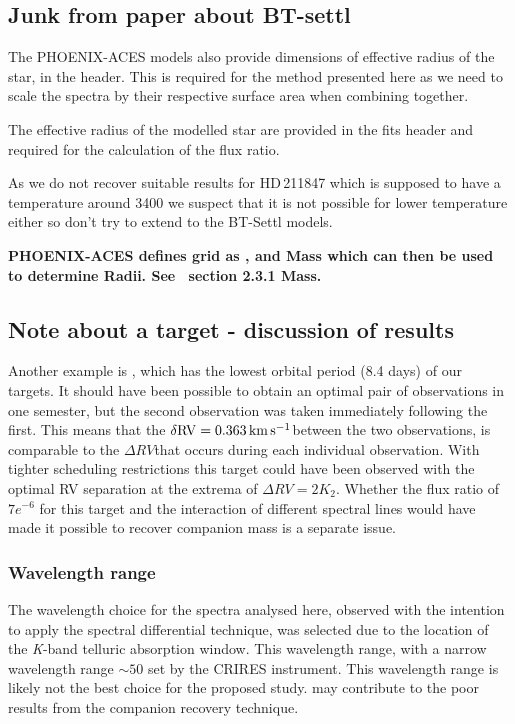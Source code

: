 \subsection{Junk from paper about BT-settl}

The {PHOENIX-ACES} models also provide dimensions of effective radius of the star, in the header.
This is required for the method presented here as we need to scale the spectra by their respective surface area when combining together.


The effective radius of the modelled star are provided in the fits header and required for the calculation of the flux ratio.


As we do not recover suitable results for HD\,211847 which is supposed to have a temperature around 3400\K{} we suspect that it is not possible for lower temperature either so don't try to extend to the {BT-Settl} models.


\textbf{
    {PHOENIX-ACES} defines grid as \Teff{}, \logg{} and Mass which can then be used to determine Radii.
    See~\citep{husser_new_2013} section 2.3.1 Mass.}




\subsection{Note about a target - discussion of results}
Another example is , which has the lowest orbital period (8.4 days) of our targets.
It should have been possible to obtain an optimal pair of observations in one semester, but the second observation was taken immediately following the first.
This means that the \(\rm \delta {RV} = 0.363\,\si{\kilo\metre\per\second}{}\)between the two observations, is comparable to the \(\Delta {RV}\)that occurs during each individual observation.
With tighter scheduling restrictions this target could have been observed with the optimal {RV} separation at the extrema of \(\Delta {RV}=2 K_{2}\).
Whether the flux ratio of \(7e^{-6}\) for this target and the interaction of different spectral lines would have made it possible to recover companion mass is a separate issue.


\subsubsection{Wavelength range}
The wavelength choice for the spectra analysed here, observed with the intention to apply the spectral differential technique, was selected due to the location of the \emph{K}-band telluric absorption window.
This wavelength range, with a narrow wavelength range \(\sim50\)\nm{} set by the {CRIRES} instrument.
This wavelength range is likely not the best choice for the proposed study.
 may contribute to the poor results from the companion recovery technique.

